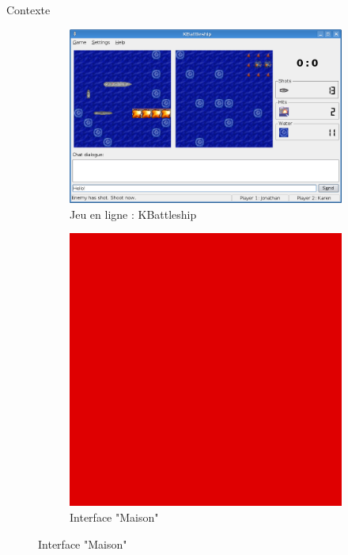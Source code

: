 	\begin{frame}{Contexte}
	    \begin{figure}
		    \begin{subfigure}{.50\textwidth}
    		    \centering
                \includegraphics[width=.9\linewidth]{images/kbattleship.png}
                \caption*{Jeu en ligne : KBattleship}
                \label{fig:kbattleship}
            \end{subfigure}
            \begin{subfigure}{.48\textwidth}
                \centering
                \includegraphics[width=.9\linewidth]{images/TODO.png} %
                 \caption*{Interface "Maison"}
                \label{fig:interfacemaison}
            \end{subfigure}
        \end{figure}
	\end{frame}
	
